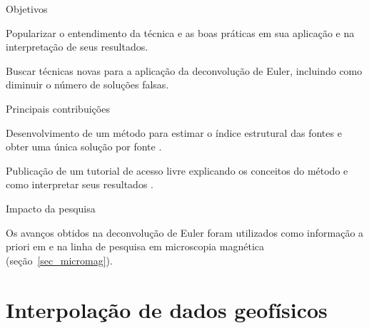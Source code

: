 \documentclass[10pt,a4paper,oneside]{book}
\begin{document}
\begin{fancyenum}{\faBullseye}{Objetivos}
  \item Popularizar o entendimento da técnica e as boas práticas em sua
    aplicação e na interpretação de seus resultados.
  \item Buscar técnicas novas para a aplicação da deconvolução de Euler,
    incluindo como diminuir o número de soluções falsas.
\end{fancyenum}
\begin{fancyenum}{\faLightbulb}{Principais contribuições}
  \item Desenvolvimento de um método para estimar o índice estrutural das
    fontes e obter uma única solução por fonte \citep{Melo2013}.
  \item Publicação de um tutorial de acesso livre explicando os conceitos do
    método e como interpretar seus resultados \citep{Uieda2014}.
\end{fancyenum}
\begin{fancyenum}{\faRocket}{Impacto da pesquisa}
  \item Os avanços obtidos na deconvolução de Euler foram utilizados
    como informação a priori em \citet{OliveiraJr2015} e na linha de pesquisa
    em microscopia magnética (seção~\ref{sec_micromag}).
\end{fancyenum}



\section{Interpolação de dados geofísicos}
\end{document}
